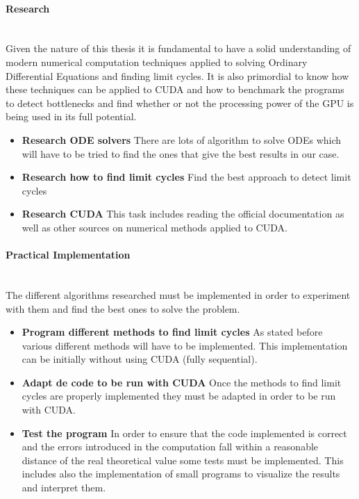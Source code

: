\paragraph{Research}\mbox{}\\

Given the nature of this thesis it is fundamental to have a solid understanding
of modern numerical computation techniques applied to solving Ordinary
Differential Equations and finding limit cycles. It is also primordial to know
how these techniques can be applied to CUDA and how to benchmark the programs to
detect bottlenecks and find whether or not the processing power of the GPU is
being used in its full potential.

\begin{itemize}
    \item \textbf{Research ODE solvers} There are lots of algorithm to solve
        ODEs which will have to be tried to find the ones that give the best
        results in our case.
    \item \textbf{Research how to find limit cycles} Find the best approach to
        detect limit cycles
    \item \textbf{Research CUDA} This task includes reading the official
        documentation as well as other sources on numerical methods applied to
        CUDA.
\end{itemize}

\paragraph{Practical Implementation}\mbox{}\\

The different algorithms researched must be implemented in order to experiment
with them and find the best ones to solve the problem.

\begin{itemize}
    \item \textbf{Program different methods to find limit cycles} As stated
        before various different methods will have to be implemented. This
        implementation can be initially without using CUDA (fully sequential).
    \item \textbf{Adapt de code to be run with CUDA} Once the methods to find
        limit cycles are properly implemented they must be adapted in order to
        be run with CUDA.
    \item \textbf{Test the program} In order to ensure that the code implemented
        is correct and the errors introduced in the computation fall within a
        reasonable distance of the real theoretical value some tests must be
        implemented. This includes also the implementation of small programs to
        visualize the results and interpret them.
\end{itemize}

